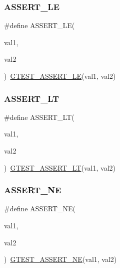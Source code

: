 \subsubsection{\texorpdfstring{ASSERT\_LE}{ASSERT\_LE}}
{\footnotesize\ttfamily \#define A\+S\+S\+E\+R\+T\+\_\+\+LE(\begin{DoxyParamCaption}\item[{}]{val1,  }\item[{}]{val2 }\end{DoxyParamCaption})~\mbox{\hyperlink{_obj__test_2lib_2googletest-release-1_88_81_2googletest_2include_2gtest_2gtest_8h_abef04dcd4a0259d378de7b3b3ffb6730}{G\+T\+E\+S\+T\+\_\+\+A\+S\+S\+E\+R\+T\+\_\+\+LE}}(val1, val2)}

\mbox{\label{googletest-master_2googletest_2include_2gtest_2gtest_8h_affc4f9cae4c3aabfe60fced83737b42c}} 
\subsubsection{\texorpdfstring{ASSERT\_LT}{ASSERT\_LT}}
{\footnotesize\ttfamily \#define A\+S\+S\+E\+R\+T\+\_\+\+LT(\begin{DoxyParamCaption}\item[{}]{val1,  }\item[{}]{val2 }\end{DoxyParamCaption})~\mbox{\hyperlink{_obj__test_2lib_2googletest-release-1_88_81_2googletest_2include_2gtest_2gtest_8h_a5a75667e637febd18e5f7d4f3abf55e8}{G\+T\+E\+S\+T\+\_\+\+A\+S\+S\+E\+R\+T\+\_\+\+LT}}(val1, val2)}

\mbox{\label{googletest-master_2googletest_2include_2gtest_2gtest_8h_aa866c8dece57912e6f51495ed3e8d8d5}} 
\subsubsection{\texorpdfstring{ASSERT\_NE}{ASSERT\_NE}}
{\footnotesize\ttfamily \#define A\+S\+S\+E\+R\+T\+\_\+\+NE(\begin{DoxyParamCaption}\item[{}]{val1,  }\item[{}]{val2 }\end{DoxyParamCaption})~\mbox{\hyperlink{_obj__test_2lib_2googletest-release-1_88_81_2googletest_2include_2gtest_2gtest_8h_a6fa9bb2b6731eba8f481e40e9e4931b3}{G\+T\+E\+S\+T\+\_\+\+A\+S\+S\+E\+R\+T\+\_\+\+NE}}(val1, val2)}

